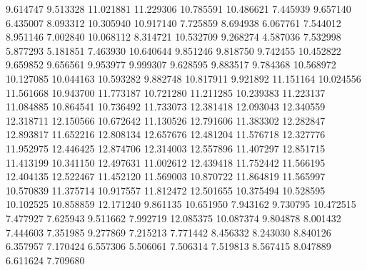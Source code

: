 9.614747
9.513328
11.021881
11.229306
10.785591
10.486621
7.445939
9.657140
6.435007
8.093312
10.305940
10.917140
7.725859
8.694938
6.067761
7.544012
8.951146
7.002840
10.068112
8.314721
10.532709
9.268274
4.587036
7.532998
5.877293
5.181851
7.463930
10.640644
9.851246
9.818750
9.742455
10.452822
9.659852
9.656561
9.953977
9.999307
9.628595
9.883517
9.784368
10.568972
10.127085
10.044163
10.593282
9.882748
10.817911
9.921892
11.151164
10.024556
11.561668
10.943700
11.773187
10.721280
11.211285
10.239383
11.223137
11.084885
10.864541
10.736492
11.733073
12.381418
12.093043
12.340559
12.318711
12.150566
10.672642
11.130526
12.791606
11.383302
12.282847
12.893817
11.652216
12.808134
12.657676
12.481204
11.576718
12.327776
11.952975
12.446425
12.874706
12.314003
12.557896
11.407297
12.851715
11.413199
10.341150
12.497631
11.002612
12.439418
11.752442
11.566195
12.404135
12.522467
11.452120
11.569003
10.870722
11.864819
11.565997
10.570839
11.375714
10.917557
11.812472
12.501655
10.375494
10.528595
10.102525
10.858859
12.171240
9.861135
10.651950
7.943162
9.730795
10.472515
7.477927
7.625943
9.511662
7.992719
12.085375
10.087374
9.804878
8.001432
7.444603
7.351985
9.277869
7.215213
7.771442
8.456332
8.243030
8.840126
6.357957
7.170424
6.557306
5.506061
7.506314
7.519813
8.567415
8.047889
6.611624
7.709680
